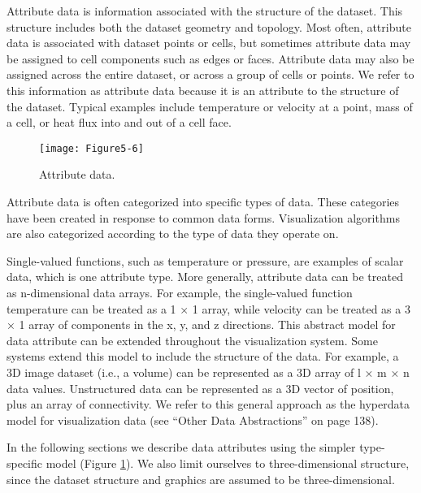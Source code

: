 \begin{description}
Attribute data is information associated with the structure of the dataset. This structure includes both the dataset geometry and topology. Most often, attribute data is associated with dataset points or cells, but sometimes attribute data may be assigned to cell components such as edges or faces. Attribute data may also be assigned across the entire dataset, or across a group of cells or points. We refer to this information as attribute data because it is an attribute to the structure of the dataset. Typical examples include temperature or velocity at a point, mass of a cell, or heat flux into and out of a cell face.

\end{description}
\begin{figure}[!htb]
	\centering
	\texttt{[image: Figure5-6]}
	\caption{Attribute data.}
	\label{fig:Figure5-6}
\end{figure}

Attribute data is often categorized into specific types of data. These categories have been created in response to common data forms. Visualization algorithms are also categorized according to the type of data they operate on.

Single-valued functions, such as temperature or pressure, are examples of scalar data, which is one attribute type. More generally, attribute data can be treated as n-dimensional data arrays. For example, the single-valued function temperature can be treated as a 1 × 1 array, while velocity can be treated as a 3 × 1 array of components in the x, y, and z directions. This abstract model for data attribute can be extended throughout the visualization system. Some systems extend this model to include the structure of the data. For example, a 3D image dataset (i.e., a volume) can be represented as a 3D array of l × m × n data values. Unstructured data can be represented as a 3D vector of position, plus an array of connectivity. We refer to this general approach as the hyperdata model for visualization data (see “Other Data Abstractions” on page 138).

In the following sections we describe data attributes using the simpler type-specific model (Figure \ref{fig:Figure5-6}). We also limit ourselves to three-dimensional structure, since the dataset structure and graphics are assumed to be three-dimensional.

